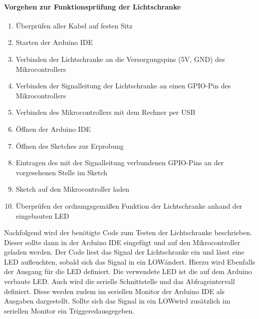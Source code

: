 \paragraph{Vorgehen zur Funktionsprüfung der Lichtschranke}
\begin{center}
\begin{enumerate}
	\item Überprüfen aller Kabel auf festen Sitz
	\item Starten der Arduino IDE
	\item Verbinden der Lichtschranke an die Versorgungspins (5V, GND) des Mikrocontrollers
	\item Verbinden der Signalleitung der Lichtschranke an einen GPIO-Pin des Mikrocontrollers
	\item Verbinden des Mikrocontrollers mit dem Rechner per USB
	\item Öffnen der Arduino IDE
	\item Öffnen des Sketches zur Erprobung
	\item Eintragen des mit der Signalleitung verbundenen GPIO-Pins an der vorgesehenen Stelle im Sketch
	\item Sketch auf den Mikrocontroller laden
	\item Überprüfen der ordnungsgemäßen Funktion der Lichtschranke anhand der eingebauten LED
\end{enumerate} 
\end{center}
Nachfolgend wird der benötigte Code zum Testen der Lichtschranke beschrieben. Dieser sollte dann in der Arduino IDE eingefügt und auf den Mikrocontroller geladen werden. Der Code liest das Signal der Lichtschranke ein und lässt eine LED aufleuchten, sobald sich das Signal in ein \glqq LOW\grqq \space ändert. Hierzu wird Ebenfalls der Ausgang für die LED definiert. Die verwendete LED ist die auf dem Arduino verbaute LED. Auch wird die serielle Schnittstelle und das Abfrageintervall definiert. Diese werden zudem im seriellen Monitor der Arduino IDE als Ausgaben dargestellt. Sollte sich das Signal in ein  \glqq LOW\grqq \space  wird zusätzlich im seriellen Monitor ein  \glqq Triggered\grqq \space ausgegeben. 

\begin{center}
\end{center}


